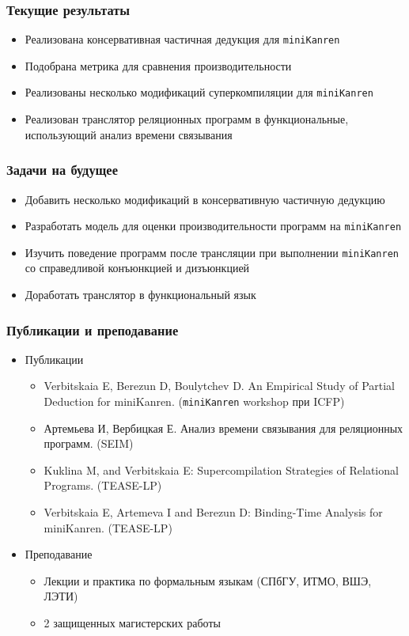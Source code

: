 \documentclass{beamer}
\newcommand{\miniKanren}{\texttt{miniKanren}\xspace}
\begin{document}
\begin{frame}[fragile]
  \frametitle{Текущие результаты}
\begin{itemize}
  \item Реализована консервативная частичная дедукция для \miniKanren
  \item Подобрана метрика для сравнения производительности
  \item Реализованы несколько модификаций суперкомпиляции для \miniKanren
  \item Реализован транслятор реляционных программ в функциональные, использующий анализ времени связывания
\end{itemize}
\end{frame}

\begin{frame}[fragile]
  \frametitle{Задачи на будущее}
  \begin{itemize}
    \item Добавить несколько модификаций в консервативную частичную дедукцию
    \item Разработать модель для оценки производительности программ на \miniKanren
    \item Изучить поведение программ после трансляции при выполнении \miniKanren со справедливой конъюнкцией и дизъюнкцией
    \item Доработать транслятор в функциональный язык
  \end{itemize}
\end{frame}

\begin{frame}[fragile]
  \frametitle{Публикации и преподавание}
  \begin{itemize}
    \item Публикации
    \begin{itemize}
      \item Verbitskaia E, Berezun D, Boulytchev D. An Empirical Study of Partial Deduction for miniKanren. (\miniKanren workshop при ICFP)
      \item Артемьева И, Вербицкая Е. Анализ времени связывания для реляционных программ. (SEIM)
      \item Kuklina M, and Verbitskaia E: Supercompilation Strategies of Relational Programs. (TEASE-LP)
      \item Verbitskaia E, Artemeva I and Berezun D: Binding-Time Analysis for miniKanren. (TEASE-LP)
    \end{itemize}
    \item Преподавание
    \begin{itemize}
      \item Лекции и практика по формальным языкам (СПбГУ, ИТМО, ВШЭ, ЛЭТИ)
      \item 2 защищенных магистерских работы
    \end{itemize}
  \end{itemize}


\end{frame}
\end{document}
